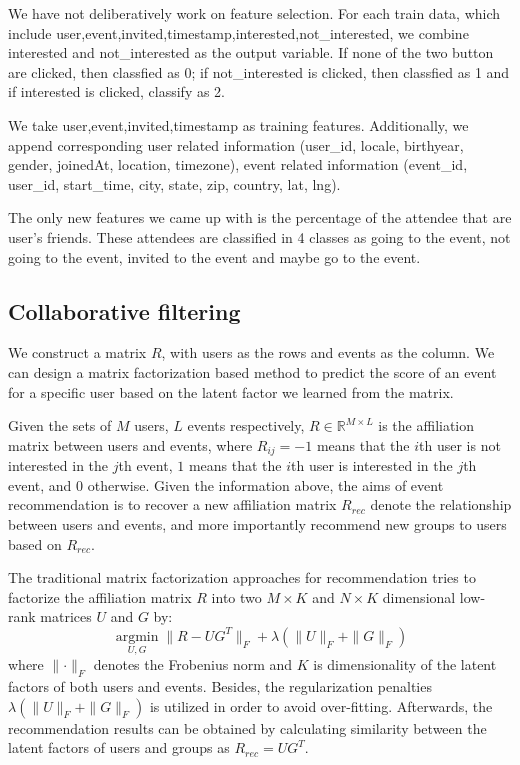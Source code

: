 \documentclass{article}
\begin{document}
We have not deliberatively work on feature selection. For each train data, which include user,event,invited,timestamp,interested,not\_interested, we combine interested and not\_interested as the output variable. If none of the two button are clicked, then classfied as 0; if not\_interested is clicked, then classfied as 1 and if interested is clicked, classify as 2. 

We take user,event,invited,timestamp as training features. Additionally, we append corresponding user related information (user\_id, locale, birthyear, gender, joinedAt, location, timezone), event related information (event\_id, user\_id, start\_time, city, state, zip, country, lat, lng).

The only new features we came up with is the percentage of the attendee that are user's friends. These attendees are classified in 4 classes as going to the event, not going to the event, invited to the event and maybe go to the event.


\subsection{Collaborative filtering}
We construct a matrix $R$, with users as the rows and events as the column. We can design a matrix factorization based method to predict the score of an event for a specific user based on the latent factor we learned from the matrix.

Given the sets of $M$ users, $L$ events respectively, $R \in \mathbb{R}^{M \times L}$ is the affiliation matrix between users and events, where $R_{ij} = -1$ means that the $i$th user is not interested in the $j$th event, $1$ means that the $i$th user is interested in the $j$th event, and $0$ otherwise. Given the information above, the aims of event recommendation is to recover a new affiliation matrix $R_{rec}$ denote the relationship between users and events, and more importantly recommend new groups to users based on $R_{rec}$.

The traditional matrix factorization approaches for recommendation tries to factorize the affiliation matrix $R$ into two $ M\times K$ and $N\times K$ dimensional low-rank matrices $U$ and $G$ by:
\begin{equation}
\underset{U, G}{\operatorname{argmin}} \parallel R - UG^T\parallel_F +
\lambda(\parallel U \parallel_F +  \parallel G \parallel_F)
\end{equation}
where $\parallel \cdot \parallel_F$ denotes the Frobenius norm and $K$ is dimensionality of the latent factors of both users and events. Besides, the regularization penalties
 $\lambda(\parallel U \parallel_F +  \parallel G \parallel_F)$ is utilized in order to avoid over-fitting.
Afterwards, the recommendation results can be obtained by calculating similarity between the latent
factors of users and groups as $R_{rec} = UG^T$.
\end{document}
